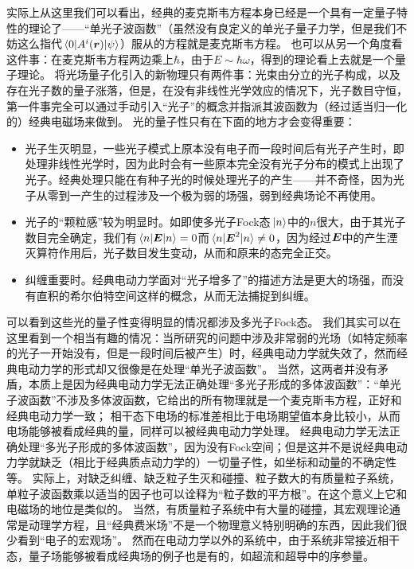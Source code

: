 实际上从这里我们可以看出，经典的麦克斯韦方程本身已经是一个具有一定量子特性的理论了——“单光子波函数”（虽然没有良定义的单光子量子力学，但是我们不妨这么指代$\mel*{0}{A^i(\vb*{r})}{\psi}$）服从的方程就是麦克斯韦方程。
也可以从另一个角度看这件事：在麦克斯韦方程两边乘上$\hbar$，由于$E \sim \hbar \omega$，得到的理论看上去就是一个量子理论。
将光场量子化引入的新物理只有两件事：光束由分立的光子构成，以及存在光子数的量子涨落，但是，在没有非线性光学效应的情况下，光子数目守恒，第一件事完全可以通过手动引入“光子”的概念并指派其波函数为（经过适当归一化的）经典电磁场来做到。
光的量子性只有在下面的地方才会变得重要：
\begin{itemize}
    \item 光子生灭明显，一些光子模式上原本没有电子而一段时间后有光子产生时，即处理非线性光学时，因为此时会有一些原本完全没有光子分布的模式上出现了光子。经典处理只能在有种子光的时候处理光子的产生——并不奇怪，因为光子从零到一产生的过程涉及一个极为弱的场强，弱到经典场论不再使用。
    \item 光子的“颗粒感”较为明显时。如即使多光子Fock态$\ket*{n}$中的$n$很大，由于其光子数目完全确定，我们有$\expval*{\vb*{E}}{n} = 0$而$\expval*{\vb*{E}^2}{n} \neq 0$，因为经过$\vb*{E}$中的产生湮灭算符作用后，光子数目发生变动，从而和原来的态完全正交。
    \item 纠缠重要时。经典电动力学面对“光子增多了”的描述方法是更大的场强，而没有直积的希尔伯特空间这样的概念，从而无法捕捉到纠缠。
\end{itemize}
可以看到这些光的量子性变得明显的情况都涉及多光子Fock态。
我们其实可以在这里看到一个相当有趣的情况：当所研究的问题中涉及非常弱的光场（如特定频率的光子一开始没有，但是一段时间后被产生）时，经典电动力学就失效了，然而经典电动力学的形式却又很像是在处理“单光子波函数”。
当然，这两者并没有矛盾，本质上是因为经典电动力学无法正确处理“多光子形成的多体波函数”：“单光子波函数”不涉及多体波函数，它给出的所有物理就是一个麦克斯韦方程，正好和经典电动力学一致；
相干态下电场的标准差相比于电场期望值本身比较小，从而电场能够被看成经典的量，同样可以被经典电动力学处理。
经典电动力学无法正确处理“多光子形成的多体波函数”，因为没有Fock空间；但是这并不是说经典电动力学就缺乏（相比于经典质点动力学的）一切量子性，如坐标和动量的不确定性等。
实际上，对缺乏纠缠、缺乏粒子生灭和碰撞、粒子数大的有质量粒子系统，单粒子波函数乘以适当的因子也可以诠释为“粒子数的平方根”。在这个意义上它和电磁场的地位是类似的。
当然，有质量粒子系统中有大量的碰撞，其宏观理论通常是动理学方程，且“经典费米场”不是一个物理意义特别明确的东西，因此我们很少看到“电子的宏观场”。
然而在电动力学以外的系统中，由于系统非常接近相干态，量子场能够被看成经典场的例子也是有的，如超流和超导中的序参量。

